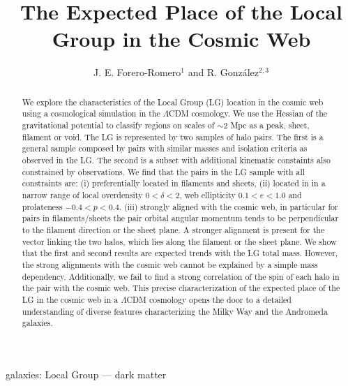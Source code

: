 \documentclass{emulateapj}
\begin{document}
\title{The Expected Place of the Local Group in the Cosmic Web}
\author{J. E. Forero-Romero$^1$ and R. Gonz\'alez$^{2,3}$}


\begin{abstract}
We explore the characteristics of the Local Group (LG)
location in the cosmic web using a cosmological simulation in the
$\Lambda$CDM cosmology.  
We use the Hessian of the gravitational potential to classify regions
on scales of $\sim 2$ Mpc as a peak, sheet, filament or void.  
The LG is represented by two samples of halo
pairs. 
The first is a general sample composed by pairs with
similar masses and isolation criteria as observed in the LG.  
The second is a subset with additional kinematic constaints also
constrained by observations. 
We find that the pairs in the LG sample with all constraints are: (i)
preferentially   located in filaments and sheets, (ii) located in in a
narrow range of local overdensity $0<\delta<2$, web ellipticity $0.1<e<1.0$ and
prolateness $-0.4<p<0.4$.  (iii) strongly aligned with the cosmic web,
in particular for pairs in filaments/sheets the pair orbital angular
momentum tends to be perpendicular to the filament direction or the
sheet plane.
A stronger alignment is present for the vector linking the two halos,
which lies along the filament or the sheet plane.  
We show that the first and second results are expected trends with the LG
total mass. 
However, the strong alignments with the cosmic web cannot be explained
by a simple mass dependency. 
Additionally, we fail to find a strong correlation of the spin of each
halo in the pair with the cosmic web.
This precise characterization of the expected place of the LG in the
cosmic web in a $\Lambda$CDM cosmology opens the door to a detailed
understanding of diverse features characterizing the Milky Way and the
Andromeda galaxies.  

\end{abstract}

\begin{keywords}
{galaxies: Local Group --- dark matter}
\end{keywords}
\end{document}
